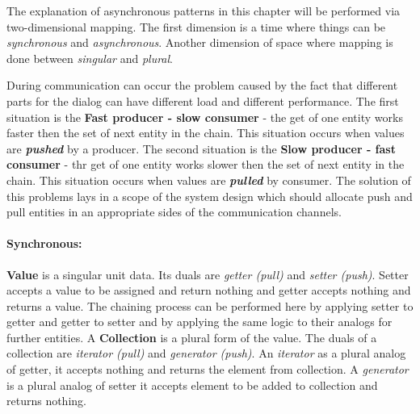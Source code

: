 The explanation of asynchronous patterns in this chapter will be performed via two-dimensional mapping. The first dimension is a time where things can be \textit{synchronous} and \textit{asynchronous}. Another dimension of space where mapping is done between \textit{singular} and \textit{plural}.

During communication can occur the problem caused by the fact that different parts for the dialog can have different load and different performance. The first situation is the \textbf{Fast producer - slow consumer} - the get of one entity works faster then the set of next entity in the chain. This situation occurs when values are \textbf{\textit{pushed}} by a producer. The second situation is the  \textbf{Slow producer - fast consumer} - thr get of one entity works slower then the  set of next entity in the chain. This situation occurs when values are \textbf{\textit{pulled}} by consumer. The solution of  this problems lays in a scope of the system design which should allocate push and pull entities in an appropriate sides of the communication channels.

\paragraph{Synchronous:} \textbf{Value} is a singular unit data. Its duals are \textit{getter (pull)} and \textit{setter (push)}. Setter accepts a value to be assigned and return nothing and getter accepts nothing and returns a value. The chaining process  can be performed here by applying setter to getter and getter to setter and by applying the same logic to their analogs for further  entities. A \textbf{Collection} is a plural form of the value. The duals of a collection are \textit{iterator (pull)} and \textit{generator (push)}. An \textit{iterator }as a plural analog of getter, it accepts nothing and returns the element from collection. A \textit{generator} is a plural analog of setter it accepts element to be added to collection and returns nothing.

